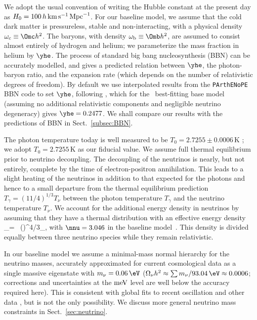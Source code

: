 We adopt the usual convention of writing the Hubble constant at the
present day as $H_0=100\,h\,{\rm km}\,{\rm s}^{-1}\,{\rm Mpc}^{-1}$.
For our baseline model, we assume that the cold dark matter is
pressureless, stable and non-interacting, with a physical density
$\omega_{\rm c} \equiv\Omc h^2$.  The baryons, with density
$\omega_{\rm b} \equiv \Omb h^2$, are assumed to consist almost
entirely of hydrogen and helium; we parameterize the mass fraction in
helium by $\yhe$.  The process of standard big bang nucleosynthesis
(BBN) can be accurately modelled, and gives a predicted relation
between $\yhe$, the photon-baryon ratio, and the expansion rate (which
depends on the number of relativistic degrees of freedom).  By default
we use interpolated results from the {\tt PArthENoPE} BBN code
\citep{Pisanti:2007hk} to set $\yhe$, following \cite{Hamann:2011ge},
which for the \Planck\ best-fitting base model
(assuming no additional relativistic
components and negligible neutrino degeneracy)
gives $\yhe = 0.2477$.
We shall compare our results with the predictions of
BBN in Sect.~\ref{subsec:BBN}.

The photon temperature today is well measured to be
$T_0 = 2.7255\pm 0.0006\,\mathrm{K}$ \citep{Fixsen:2009ug};
we adopt $T_0 = 2.7255\,\mathrm{K}$ as our fiducial value.
We assume full thermal equilibrium prior to neutrino decoupling.
The decoupling of the neutrinos is nearly, but not entirely, complete
by the time of electron-positron annihilation.
This leads to a slight heating of the neutrinos in addition to that
expected for the photons and hence to a small departure from the
thermal equilibrium prediction $T_\gamma = (11/4)^{1/3} T_\nu$ between the
photon temperature $T_\gamma$ and the neutrino temperature $T_\nu$.
We account for the additional energy density in neutrinos by
assuming that they have a thermal distribution with an effective
energy density
\be
  \rho_\nu = \nnu\,
    \left(\right)^{4/3}\rho_\gamma,
    \label{def:Neff}
\ee
with $\nnu =3.046$ in the baseline model~\citep{Mangano:2001iu,Mangano:2005cc}.
This density is divided equally between three neutrino species
while they remain relativistic.

In our baseline model we assume a minimal-mass normal hierarchy for the
neutrino masses, accurately approximated for current cosmological data
as a single massive eigenstate with $m_\nu=0.06\, \eV$ ($\Omega_\nu h^2
\approx \sum m_\nu/93.04\,\eV \approx 0.0006$; corrections and
uncertainties at the ${\rm meV}$ level are well below the accuracy
required here).  This is consistent with global fits to recent
oscillation and other data \citep{Tortola:2012te}, but is not the only
possibility.  We discuss more general neutrino mass constraints
in Sect.~\ref{sec:neutrino}.

